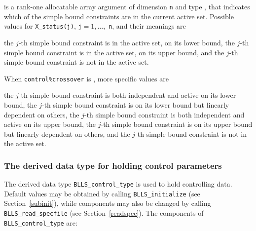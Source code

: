 \documentclass{galahad}
\newcommand{\packagename}{BLLS}
\begin{document}
\begin{description}
 is a rank-one allocatable array argument of dimension {\tt n}
and type \integer, that indicates which of the simple bound
constraints are in the current active set. Possible values for
{\tt X\_status(j)}, {\tt j}$=1, \ldots ,$ {\tt n}, and their meanings are
\begin{description}
 the $j$-th simple bound constraint
is in the active set, on its lower bound,
 the $j$-th simple bound constraint
is in the active set, on its upper bound, and
  the $j$-th simple bound constraint is not in the active set.
\end{description}
When {\tt control\%crossover} is \true, more specific values are
\begin{description}
 the $j$-th simple bound constraint
is both independent and active on its lower bound,
 the $j$-th simple bound constraint
is on its lower bound but linearly dependent on others,
 the $j$-th simple bound constraint
is both independent and active on its upper bound,
 the $j$-th simple bound constraint
is on its upper bound but linearly dependent on others, and
 the $j$-th simple bound constraint is not in the active set.
\end{description}

\end{description}


\subsubsection{The derived data type for holding control
 parameters}\label{typecontrol}
The derived data type
{\tt \packagename\_control\_type}
is used to hold controlling data. Default values may be obtained by calling
{\tt \packagename\_initialize}
(see Section~\ref{subinit}),
while components may also be changed by calling
{\tt \packagename\_read\-\_specfile}
(see Section~\ref{readspec}).
The components of
{\tt \packagename\_control\_type}
are:
\end{document}
